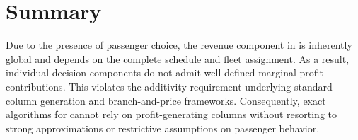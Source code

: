 \section{Summary}

Due to the presence of passenger choice, the revenue component in \problemName is inherently global and depends on the complete schedule and fleet assignment. As a result, individual decision components do not admit well-defined marginal profit contributions. This violates the additivity requirement underlying standard column generation and branch-and-price frameworks. Consequently, exact algorithms for \problemName cannot rely on profit-generating columns without resorting to strong approximations or restrictive assumptions on passenger behavior.
